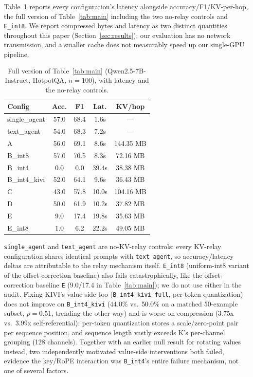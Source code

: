 \documentclass[11pt]{article}
\begin{document}
Table~\ref{tab:full} reports every configuration's latency alongside
accuracy/F1/KV-per-hop, the full version of Table~\ref{tab:main}
including the two no-relay controls and \texttt{E\_int8}. We report
compressed bytes and latency as two distinct quantities throughout this
paper (Section~\ref{sec:results}): our evaluation has no network
transmission, and a smaller cache does not measurably speed up our
single-GPU pipeline.

\begin{table}[h]
\centering
\small
\begin{tabular}{lcccc}
\toprule
\textbf{Config} & \textbf{Acc.} & \textbf{F1} & \textbf{Lat.} & \textbf{KV/hop} \\
\midrule
single\_agent & 57.0 & 68.4 & 1.6s & --- \\
text\_agent & 54.0 & 68.3 & 7.2s & --- \\
A & 56.0 & 69.1 & 8.6s & 144.35 MB \\
B\_int8 & 57.0 & 70.5 & 8.3s & 72.16 MB \\
B\_int4 & 0.0 & 0.0 & 39.4s & 38.38 MB \\
B\_int4\_kivi & 52.0 & 64.1 & 9.6s & 36.43 MB \\
C & 43.0 & 57.8 & 10.0s & 104.16 MB \\
D & 50.0 & 61.9 & 10.2s & 37.82 MB \\
E & 9.0 & 17.4 & 19.8s & 35.63 MB \\
E\_int8 & 1.0 & 6.2 & 22.2s & 49.05 MB \\
\bottomrule
\end{tabular}
\caption{Full version of Table~\ref{tab:main} (Qwen2.5-7B-Instruct,
HotpotQA, $n=100$), with latency and the no-relay controls.}
\label{tab:full}
\end{table}

\texttt{single\_agent} and \texttt{text\_agent} are no-KV-relay
controls: every KV-relay configuration shares identical prompts with
\texttt{text\_agent}, so accuracy/latency deltas are attributable to
the relay mechanism itself. \texttt{E\_int8} (uniform-int8 variant of
the offset-correction baseline) also fails catastrophically, like the
offset-correction baseline \texttt{E} (9.0/17.4 in Table~\ref{tab:main}); we do not
use either in the audit. Fixing KIVI's value side
too (\texttt{B\_int4\_kivi\_full}, per-token quantization) does not
improve on \texttt{B\_int4\_kivi} (44.0\% vs.\ 50.0\% on a matched
50-example subset, $p=0.51$, trending the other way) and is worse on
compression (3.75x vs.\ 3.99x self-referential): per-token quantization
stores a scale/zero-point pair per sequence position, and sequence
length vastly exceeds K's per-channel grouping (128 channels). Together
with an earlier null result for rotating values instead, two
independently motivated value-side interventions both failed, evidence
the key/RoPE interaction was \texttt{B\_int4}'s entire failure
mechanism, not one of several factors.
\end{document}
